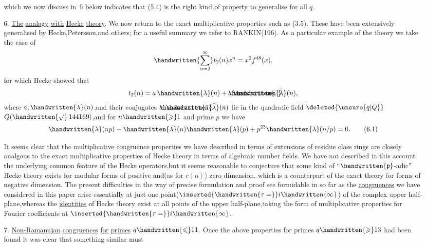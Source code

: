 \noindent which we now discuss  in \handwritten{\S}\,6 below indicates that (5.4) is the right kind of property to generalise for all \uline{$q$}.

6. \uline{The} \uline{analogy} \uline{with} \uline{Hecke} \uline{theory}. We now return to the exact multiplicative properties such as (3.5). These have been extensively generalised by Hecke,Petersson,and others; for a useful summary we refer to RANKIN(196\hspace{.6em}). As a particular example of the theory we take the case of
\[
\handwritten{\sum_{n=2}^{\infty}}t_{2}(n)x^{n}=x^{2}f^{48}(x),
\]
for which Hecke showed that
\[
t_{2}(n)=a\,\handwritten{\lambda}(n)+\mathord{\rlap{$\handwritten{\bar{\phantom{a}}}$}a}\,\handwritten{\bar{\lambda}}(n),
\]
where $a,\handwritten{\lambda}(n)$,and their conjugates $\mathord{\rlap{$\handwritten{\bar{\phantom{a}}}$}a},\handwritten{\bar{\lambda}}(n)$ lie in the quadratic field $\deleted{\unsure{q|Q}}$\reversemarginpar{} $Q(\handwritten{\surd}\,144169)$,and for $n\handwritten{\geqslant}1$ and prime $p$ we have
\[
\handwritten{\lambda}(np)-\handwritten{\lambda}(n)\handwritten{\lambda}(p)+p^{23}\handwritten{\lambda}(n/p)=0.
\tag*{(6.1)}
\]

It seems clear that the multiplicative congruence properties we have described in terms of extensions of residue class rings are closely analgous to the exact multiplicative properties of Hecke theory in terms of algebraic number fields. We have not described in this account the underlying common feature of the Hecke operators,but it seems reasonable to conjecture that some kind of ``$\handwritten{\mathfrak{p}}$-adic'' Hecke theory\normalmarginpar{} exists for modular forms of positive and(as for $c(n)$) zero dimension, which is a counterpart of the exact theory for forms of negative dimension. The present difficulties in the way of precise formulation and proof see formidable in so far as the \uline{congruences} we have considered in this paper arise essentially at just one point($\inserted{\handwritten{\tau=}}i\handwritten{\infty}$) of the complex upper half-plane,whereas the \uline{identities} of Hecke theory exist at all points of the upper half-plane,taking the form of multiplicative properties for Fourier coefficients at $\inserted{\handwritten{\tau=}}i\handwritten{\infty}$.

7. \uline{Non-Ramanujan} \uline{congruences} \uline{for} \uline{primes} $q\handwritten{\leqslant}11$. Once the above properties for primes $q\handwritten{\geqslant}13$ had been found it was clear that something similar must
